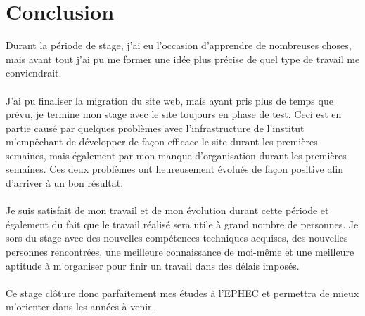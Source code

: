 \documentclass[11pt]{article}
\begin{document}
\newpage

\section{Conclusion}

Durant la période de stage, j'ai eu l'occasion d'apprendre de nombreuses choses, mais avant tout j'ai pu me former une idée plus précise de quel type de travail me conviendrait.\\
\\
J'ai pu finaliser la migration du site web, mais ayant pris plus de temps que prévu, je termine mon stage avec le site toujours en phase de test.
Ceci est en partie causé par quelques problèmes avec l'infrastructure de l'institut m'empêchant de développer de façon efficace le site durant les premières semaines, mais également par mon manque d'organisation durant les premières semaines.
Ces deux problèmes ont heureusement évolués de façon positive afin d'arriver à un bon résultat.\\
\\
Je suis satisfait de mon travail et de mon évolution durant cette période et également du fait que le travail réalisé sera utile à grand nombre de personnes.
Je sors du stage avec des nouvelles compétences techniques acquises, des nouvelles personnes rencontrées, une meilleure connaissance de moi-même et une meilleure aptitude à m'organiser pour finir un travail dans des délais imposés.\\
\\
Ce stage clôture donc parfaitement mes études à l'EPHEC et permettra de mieux m'orienter dans les années à venir.
\end{document}
